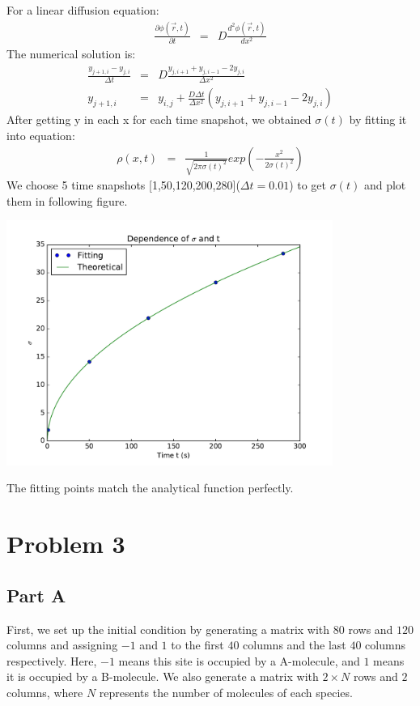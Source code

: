 \documentclass{article}
\begin{document}
For a linear diffusion equation:
\begin{eqnarray}
  \nonumber \frac{\partial\phi(\vec r, t)}{\partial t} &=& D\frac{d^2\phi(\vec r, t)}{dx^2}
\end{eqnarray}
\quad The numerical solution is:
\begin{eqnarray}
  \nonumber \frac{y_{j+1, i}-y_{j, i}}{\Delta t} &=& D\frac{y_{j, i+1}+y_{j, i-1}-2y_{j, i}}{\Delta x^2} \\
  \nonumber y_{j+1, i} &=& y_{i, j}+\frac{D\Delta t}{\Delta x^2}(y_{j, i+1}+y_{j, i-1}-2y_{j, i})
\end{eqnarray}
\quad After getting y in each x for each time snapshot, we obtained $\sigma(t)$ by fitting it into equation:
\begin{eqnarray}
  \nonumber \rho(x,t) &=& \frac{1}{\sqrt{2\pi \sigma(t)^2}}exp\left(-\frac{x^2}{2\sigma (t)^2}\right)
\end{eqnarray}
\quad We choose 5 time snapshots [1,50,120,200,280]($\Delta t=0.01$) to get $\sigma(t)$ and plot them in following figure.
\begin{center}
  \includegraphics[width=0.8\textwidth]{./sigma.pdf}
\end{center}
\quad The fitting points match the analytical function perfectly.
\section{Problem 3}
\subsection{Part A}
\quad First, we set up the initial condition by generating a matrix with $80$ rows
and $120$ columns and assigning $-1$ and $1$ to the first $40$ columns and
the last $40$ columns respectively. Here, $-1$ means this site is occupied
by a A-molecule, and $1$ means it is occupied by a B-molecule. We also
generate a matrix with $2\times N$ rows and $2$ columns, where $N$
represents the number of molecules of each species.
\end{document}
